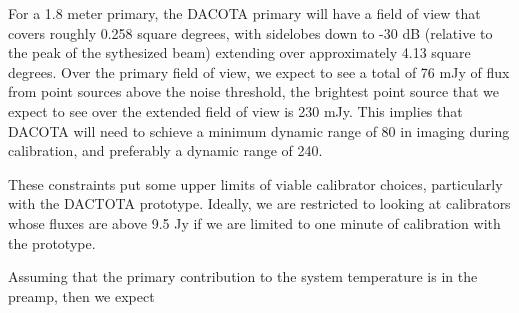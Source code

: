 \documentclass[preprint]{aastex}
\begin{document}
For a 1.8 meter primary, the DACOTA primary will have a field of view that covers roughly 0.258 square degrees, with sidelobes down to -30 dB (relative to the peak of the sythesized beam) extending over approximately 4.13 square degrees. Over the primary field of view, we expect to see a total of 76 mJy of flux from point sources above the noise threshold, the brightest point source that we expect to see over the extended field of view is 230 mJy. This implies that DACOTA will need to schieve a minimum dynamic range of 80 in imaging during calibration, and preferably a dynamic range of 240.

These constraints put some upper limits of viable calibrator choices, particularly with the DACTOTA prototype. Ideally, we are restricted to looking at calibrators whose fluxes are above 9.5 Jy if we are limited to one minute of calibration with the prototype. 

Assuming that the primary contribution to the system temperature is in the preamp, then we expect 
\end{document}
